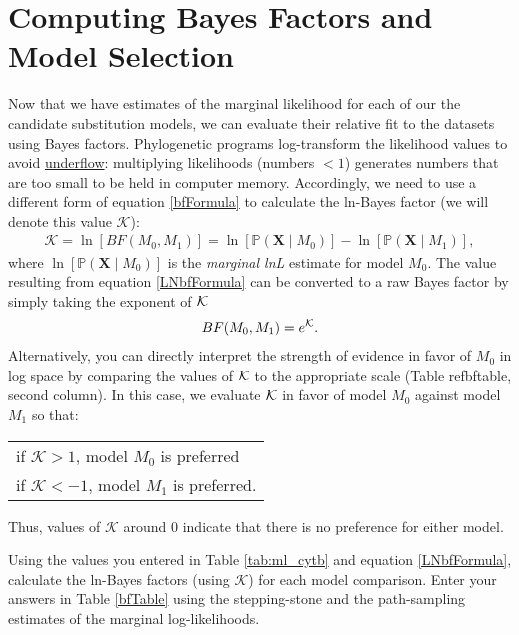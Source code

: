 \FloatBarrier
\section{Computing Bayes Factors and Model Selection}

Now that we have estimates of the marginal likelihood for each of our the candidate substitution models, we can evaluate their relative fit to the datasets using Bayes factors.
Phylogenetic programs log-transform the likelihood values to avoid \href{http://en.wikipedia.org/wiki/Arithmetic_underflow}{underflow}: multiplying likelihoods (numbers $< 1$) generates numbers that are too small to be held in computer memory.
Accordingly, we need to use a different form of equation \ref{bfFormula} to calculate the ln-Bayes factor (we will denote this value $\mathcal{K}$):
\begin{align}\label{LNbfFormula}
\mathcal{K}=\ln[BF(M_0,M_1)] = \ln[\mathbb{P}(\mathbf X \mid M_0)]-\ln[\mathbb{P}(\mathbf X \mid M_1)],
\end{align}
where $\ln[\mathbb{P}(\mathbf X \mid M_0)]$ is the \textit{marginal lnL} estimate for model $M_0$. 
The value resulting from equation \ref{LNbfFormula} can be converted to a raw Bayes factor by simply taking the exponent of $\cal{K}$
\begin{align}\label{LNbfFormula2}
BF(M_0,M_1) = e^{\cal{K}}.
\end{align}
Alternatively, you can directly interpret the strength of evidence in favor of $M_0$ in log space by comparing the values of $\cal{K}$ to the appropriate scale (Table ref{bftable}, second column).
In this case, we evaluate $\cal{K}$ in favor of model $M_0$ against model $M_1$ so that:
\begin{center}
\begin{tabular}{l}
if $\mathcal{K} > 1$, model $M_0$ is preferred\\
if $\mathcal{K} < -1$, model $M_1$ is preferred.
\end{tabular}
\end{center}
Thus, values of $\mathcal{K}$ around 0 indicate that there is no preference for either model. 

Using the values you entered in Table \ref{tab:ml_cytb} and equation \ref{LNbfFormula}, calculate the ln-Bayes factors (using $\mathcal{K}$) for each model comparison. 
Enter your answers in Table \ref{bfTable} using the stepping-stone and the path-sampling estimates of the marginal log-likelihoods. 

